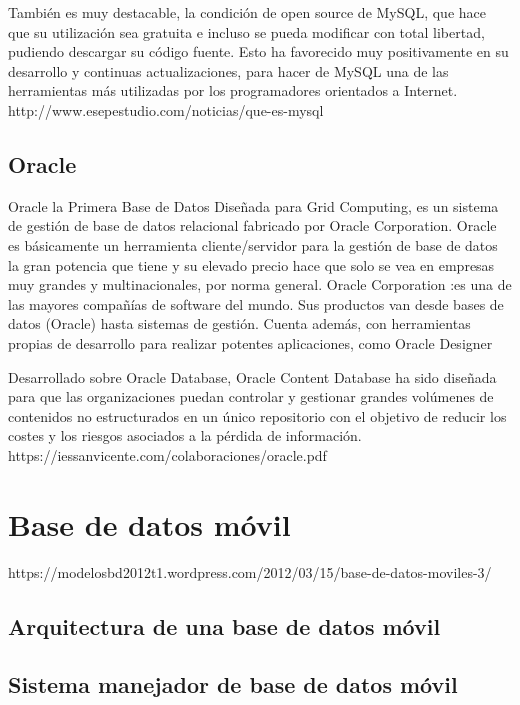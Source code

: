 También es muy destacable, la condición de open source de MySQL, que hace que su utilización sea gratuita e incluso se pueda modificar con total libertad, pudiendo descargar su código fuente. Esto ha favorecido muy positivamente en su desarrollo y continuas actualizaciones, para hacer de MySQL una de las herramientas más utilizadas por los programadores orientados a Internet.
\setlength{\parskip}{0mm}
http://www.esepestudio.com/noticias/que-es-mysql

\subsection{Oracle}
\setlength{\parskip}{5mm}
Oracle la Primera Base de Datos Diseñada para Grid Computing, es un sistema de gestión de base de datos relacional fabricado por Oracle Corporation. Oracle es básicamente un herramienta cliente/servidor para la gestión de base de datos la gran potencia que tiene y su elevado precio hace que solo se vea en empresas muy grandes y multinacionales, por norma general. Oracle Corporation :es una de las mayores compañías de software del mundo. Sus productos van desde bases de datos (Oracle) hasta sistemas de gestión. Cuenta además, con herramientas propias de desarrollo para realizar potentes aplicaciones, como Oracle Designer

Desarrollado sobre Oracle Database, Oracle Content Database ha sido diseñada para que las organizaciones puedan controlar y gestionar grandes volúmenes de contenidos no estructurados en un único repositorio con el objetivo de reducir los costes y los riesgos asociados a la pérdida de información.
\setlength{\parskip}{0mm}
https://iessanvicente.com/colaboraciones/oracle.pdf

\section{Base de datos móvil} 		

https://modelosbd2012t1.wordpress.com/2012/03/15/base-de-datos-moviles-3/



\subsection{Arquitectura de una base de datos móvil} 

\subsection{Sistema manejador de base de datos móvil} 


